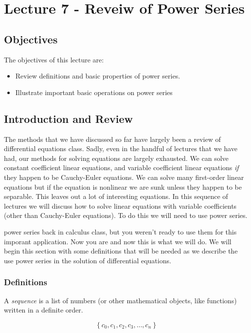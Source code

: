 \chapter{Lecture 7 - Reveiw of Power Series}
\label{ch:lec7}
\section{Objectives}
The objectives of this lecture are:
\begin{itemize}
\item Review definitions and basic properties of power series.
\item Illustrate important basic operations on power series
\end{itemize}

\section{Introduction and Review}
The methods that we have discussed so far have largely been a review of differential equations class.  Sadly, even in the handful of lectures that we have had, our methods for solving equations are largely exhausted.  We can solve constant coefficient linear equations, and variable coefficient linear equations \emph{if} they happen to be Cauchy-Euler equations.  We can solve many first-order linear equations but if the equation is nonlinear we are sunk unless they happen to be separable.  This leaves out a lot of interesting equations.  In this sequence of lectures we will discuss how to solve linear equations with variable coefficients (other than Cauchy-Euler equations).  To do this we will need to use power series. 

 power series back in calculus class, but you weren't ready to use them for this imporant application.  Now you are and now this is what we will do.  We will begin this section with some definitions that will be needed as we describe the use power series in the solution of differential equations.

\subsection{Definitions}
\begin{definition}[Sequence]
A \emph{sequence} is a list of numbers (or other mathematical objects, like functions) written in a definite order.

\begin{equation*}
\left\{c_0, c_1, c_2, c_3, \dots , c_n\right\}
\end{equation*}
\end{definition}


